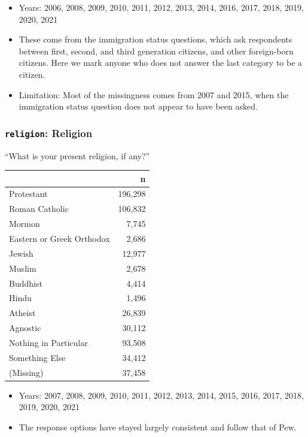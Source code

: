 \documentclass[10pt,article,oneside]{memoir}
\theoremstyle{definition}
\begin{document}
\begin{itemize}
\tightlist
\item
  Years: 2006, 2008, 2009, 2010, 2011, 2012, 2013, 2014, 2016, 2017,
  2018, 2019, 2020, 2021
\item
  These come from the immigration status questions, which ask
  respondents between first, second, and third generation citizens, and
  other foreign-born citizens. Here we mark anyone who does not answer
  the last category to be a citizen.
\item
  Limitation: Most of the missingness comes from 2007 and 2015, when the
  immigration status question does not appear to have been asked.
\end{itemize}

\hypertarget{religion-religion}{%
\subsubsection{\texorpdfstring{\texttt{religion}:
Religion}{religion: Religion}}\label{religion-religion}}

``What is your present religion, if any?''

\begin{table}[H]
\centering
\begin{tabular}[t]{lr}
\toprule
 & n\\
\midrule
Protestant & 196,298\\
Roman Catholic & 106,832\\
Mormon & 7,745\\
Eastern or Greek Orthodox & 2,686\\
Jewish & 12,977\\
Muslim & 2,678\\
Buddhist & 4,414\\
Hindu & 1,496\\
Atheist & 26,839\\
Agnostic & 30,112\\
Nothing in Particular & 93,508\\
Something Else & 34,412\\
(Missing) & 37,458\\
\bottomrule
\end{tabular}
\end{table}

\begin{itemize}
\tightlist
\item
  Years: 2007, 2008, 2009, 2010, 2011, 2012, 2013, 2014, 2015, 2016,
  2017, 2018, 2019, 2020, 2021
\item
  The response options have stayed largely consistent and follow that of
  Pew.
\end{itemize}
\end{document}
